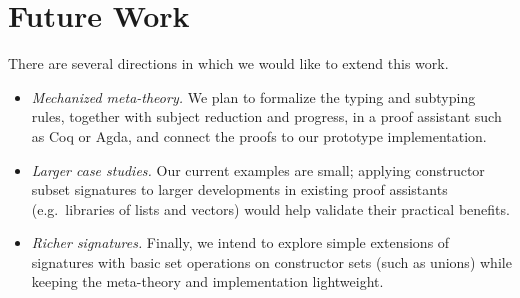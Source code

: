 \documentclass[a4paper, anonymous, UKenglish,cleveref, autoref, thm-restate]{lipics-v2021}
\begin{document}
\section{Future Work}
There are several directions in which we would like to extend this work.

\begin{itemize}
\item \emph{Mechanized meta-theory.} We plan to formalize the typing and subtyping rules, together with subject reduction and progress, in a proof assistant such as Coq or Agda, and connect the proofs to our prototype implementation.
\item \emph{Larger case studies.} Our current examples are small; applying constructor subset signatures to larger developments in existing proof assistants (e.g.\ libraries of lists and vectors) would help validate their practical benefits.
\item \emph{Richer signatures.} Finally, we intend to explore simple extensions of signatures with basic set operations on constructor sets (such as unions) while keeping the meta-theory and implementation lightweight.
\end{itemize}


\end{document}
